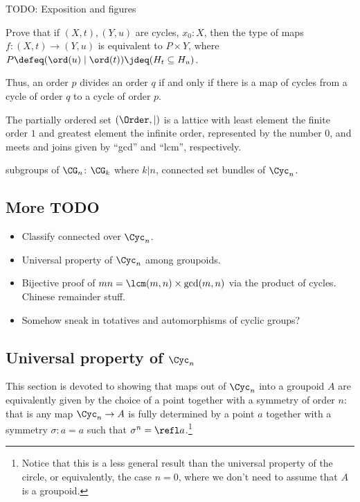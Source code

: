 {\color{casblue} TODO: Exposition and figures

\begin{xca}
  Prove that if $(X,t),(Y,u)$ are cycles, $x_0:X$,
  then the type of maps $f : (X,t) \to (Y,u)$ is equivalent to $P\times Y$,
  where $P\defeq(\ord(u) \mid \ord(t)) \jdeq (H_t \subseteq H_u)$.
\end{xca}

Thus, an order $p$ divides an order $q$ if and only if
there is a map of cycles from a cycle of order $q$
to a cycle of order $p$.
\begin{theorem}
  The partially ordered set $(\Order,|)$ is a lattice
  with least element the finite order $1$
  and greatest element the infinite order, represented by the number $0$,
  and meets and joins given by “gcd” and “lcm”, respectively.
\end{theorem}

subgroups of $\CG_n$: $\CG_k$ where $k | n$,
connected set bundles of $\Cyc_n$.

\subsection{More TODO}

\begin{itemize}
\item Classify connected \coverings over $\Cyc_n$.
\item Universal property of $\Cyc_n$ among groupoids.
\item Bijective proof of $mn = \lcm(m,n)\times\gcd(m,n)$ via the product of cycles.
  Chinese remainder stuff.
\item Somehow sneak in totatives and automorphisms of cyclic groups?
\end{itemize}
}

\subsection{Universal property of $\Cyc_n$}

This section is devoted to showing that maps out of $\Cyc_n$ into a groupoid $A$
are equivalently given by the choice of a point together with a symmetry of
order $n$: that is any map $\Cyc_n \to A$ is fully determined by a point $a$ together with a symmetry $\sigma:a=a$ such that
$\sigma^n=\refl a$.\footnote{Notice that this is a less general result than the universal property of the circle, or equivalently, the case $n=0$, where we don't need to assume that $A$ is a groupoid.}

